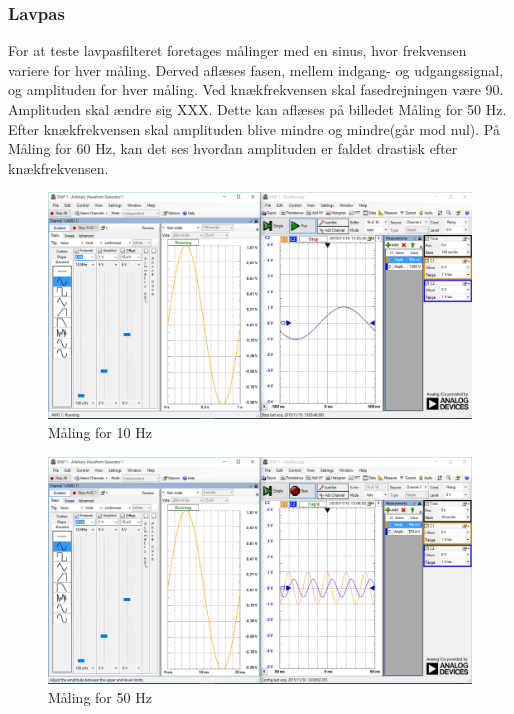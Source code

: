 \subsubsection{Lavpas}
For at teste lavpasfilteret foretages målinger med en sinus, hvor frekvensen variere for hver måling. Derved aflæses fasen, mellem indgang- og udgangssignal, og amplituden for hver måling. 
Ved knækfrekvensen skal fasedrejningen være 90\textdegree. Amplituden skal ændre sig XXX. Dette kan aflæses på billedet Måling for 50 Hz.
Efter knækfrekvensen skal amplituden blive mindre og mindre(går mod nul). På Måling for 60 Hz, kan det ses hvordan amplituden er faldet drastisk efter knækfrekvensen.  \\
\begin{figure}[H]
	\centering
	\includegraphics[width=1.0\textwidth]{Figurer/10Hz}
	\caption{Måling for 10 Hz}
	\label{fig:maeling10Hz}
\end{figure}

\begin{figure}[H]
	\centering
	\includegraphics[width=1.0\textwidth]{Figurer/50Hz}
	\caption{Måling for 50 Hz}
	\label{fig:maeling50Hz}
\end{figure}


